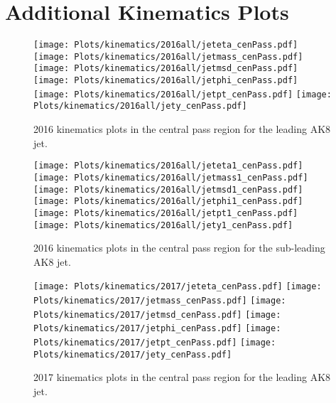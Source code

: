 
\newpage
\section{Additional Kinematics Plots}
\label{sec:appendix_kinematics}


\begin{figure}[htp]
	\begin{center}
		
		\texttt{[image: Plots/kinematics/2016all/jeteta\_cenPass.pdf]}
		\texttt{[image: Plots/kinematics/2016all/jetmass\_cenPass.pdf]}
		\texttt{[image: Plots/kinematics/2016all/jetmsd\_cenPass.pdf]}
		\texttt{[image: Plots/kinematics/2016all/jetphi\_cenPass.pdf]}
		\texttt{[image: Plots/kinematics/2016all/jetpt\_cenPass.pdf]}
		\texttt{[image: Plots/kinematics/2016all/jety\_cenPass.pdf]}
		
		\caption{2016 kinematics plots in the central pass region for the leading AK8 jet.}
		\label{fig:kin2016_cenpass}
	\end{center}
\end{figure}



\begin{figure}[htp]
	\begin{center}

		\texttt{[image: Plots/kinematics/2016all/jeteta1\_cenPass.pdf]}
		\texttt{[image: Plots/kinematics/2016all/jetmass1\_cenPass.pdf]}
		\texttt{[image: Plots/kinematics/2016all/jetmsd1\_cenPass.pdf]}
		\texttt{[image: Plots/kinematics/2016all/jetphi1\_cenPass.pdf]}
		\texttt{[image: Plots/kinematics/2016all/jetpt1\_cenPass.pdf]}
		\texttt{[image: Plots/kinematics/2016all/jety1\_cenPass.pdf]}

		\caption{2016 kinematics plots in the central pass region for the sub-leading AK8 jet.}
		\label{fig:kin2016_cenpass}
	\end{center}
\end{figure}



\begin{figure}[htp]
	\begin{center}
		
		\texttt{[image: Plots/kinematics/2017/jeteta\_cenPass.pdf]}
		\texttt{[image: Plots/kinematics/2017/jetmass\_cenPass.pdf]}
		\texttt{[image: Plots/kinematics/2017/jetmsd\_cenPass.pdf]}
		\texttt{[image: Plots/kinematics/2017/jetphi\_cenPass.pdf]}
		\texttt{[image: Plots/kinematics/2017/jetpt\_cenPass.pdf]}
		\texttt{[image: Plots/kinematics/2017/jety\_cenPass.pdf]}
		
		\caption{2017 kinematics plots in the central pass region for the leading AK8 jet.}
		\label{fig:kin2017_cenpass}
	\end{center}
\end{figure}



